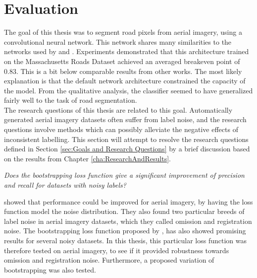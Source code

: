 \section{Evaluation}
\label{sec:SummaryDiscussion}
The goal of this thesis was to segment road pixels from aerial imagery, using a convolutional neural network. This network shares many similarities to the networks used by \cite{Mnih_aerial_images_noisy} and \citep{MnihThesis}. Experiments demonstrated that this architecture trained on the Massachusetts Roads Dataset achieved an averaged breakeven point of 0.83. This is a bit below comparable results from other works. The most likely explanation is that the default network architecture constrained the capacity of the model. From the qualitative analysis, the classifier seemed to have generalized fairly well to the task of road segmentation.\\

 The research questions of this thesis are related to this goal. Automatically generated aerial imagery datasets often suffer from label noise, and the research questions involve methods which can possibly alleviate the negative effects of inconsistent labelling. This section will attempt to resolve the research questions defined in Section \ref{sec:Goals and Research Questions} by a brief discussion based on the results from Chapter \ref{cha:ResearchAndResults}.
 
\begin{description}[ style=nextline, leftmargin=1.5em, rightmargin=1.5em]
\item[Research question 1:]{\it Does the bootstrapping loss function give a significant improvement of precision and recall for datasets with noisy labels?}
\end{description}

\cite{Mnih_aerial_images_noisy} showed that performance could be improved for aerial imagery, by having the loss function model the noise distribution. They also found two particular breeds of label noise in aerial imagery datasets, which they called omission and registration noise. The bootstrapping loss function proposed by \cite{Reed_noisy_labels_bootstrapping}, has also showed promising results for several noisy datasets. In this thesis, this particular loss function was therefore tested on aerial imagery, to see if it provided robustness towards omission and registration noise. Furthermore, a proposed variation of bootstrapping was also tested.\\

